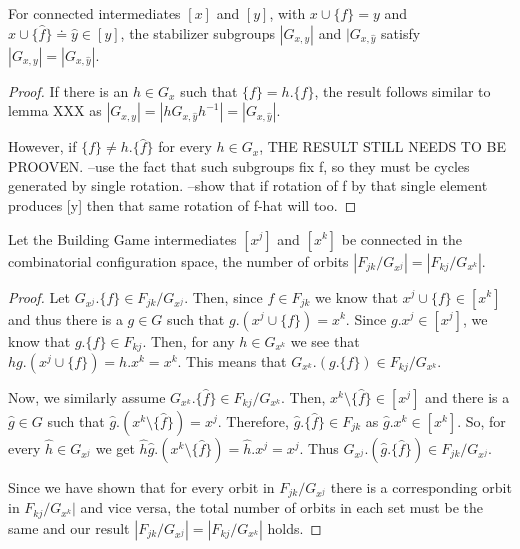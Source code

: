 \begin{mylem}
For connected intermediates $[x]$ and $[y]$, with $x \cup \{f\} = y$ and $x \cup \{\hat{f}\} \doteq \hat{y}\in [y]$, the stabilizer subgroups $|G_{x,y}|$ and  $|G_{x,\hat{y}}$ satisfy $|G_{x,y}| = |G_{x,\hat{y}}|$. 
\end{mylem}
\begin{proof}
If there is an $h \in G_x$ such that $\{f\} = h.\{\hat{f}\}$, the result follows similar to lemma XXX as $|G_{x,y}| = |hG_{x,\hat{y}}h^{-1}| = |G_{x,\hat{y}}|$.

However, if $\{f\} \neq h.\{\hat{f}\}$ for every $h \in G_x$, THE RESULT STILL NEEDS TO BE PROOVEN. 
--use the fact that such subgroups fix f, so they must be cycles generated by single rotation. --show that if rotation of f by that single element produces [y] then that same rotation of f-hat will too.  
\end{proof}



\begin{mylem}
\label{lem:I}
Let the Building Game intermediates $[x^j]$ and $[x^k]$ be connected in the combinatorial configuration space, the number of orbits $|F_{jk}/G_{x^j}| = |F_{kj}/G_{x^k}|$.
\end{mylem}
\begin{proof}
Let $G_{x^j}.\{f\} \in F_{jk}/G_{x^j}$. Then, since $f \in F_{jk}$ we know that $x^j\cup\{f\} \in [x^k]$ and thus there is a $g \in G$ such that $g.(x^j\cup\{f\}) = x^k$. Since $g.x^j \in [x^j]$, we know that $g.\{f\} \in F_{kj}$. Then, for any $h \in G_{x^k}$ we see that $hg.(x^j\cup\{f\}) = h.x^k = x^k$. This means that $G_{x^k}.(g.\{f\}) \in F_{kj}/G_{x^k}$.

Now, we similarly assume $G_{x^k}.\{\hat{f}\} \in F_{kj}/G_{x^k}$. Then, $x^k \setminus \{\hat{f}\} \in [x^j]$ and there is a $\hat{g} \in G$ such that $\hat{g}.(x^k \setminus \{\hat{f}\}) = x^j$. Therefore, $\hat{g}.\{\hat{f}\} \in F_{jk}$ as $\hat{g}.x^k \in [x^k]$. So, for every $\hat{h} \in G_{x^j}$ we get $\hat{h}\hat{g}.(x^k\setminus\{\hat{f}\}) = \hat{h}.x^j = x^j$. Thus $G_{x^j}.(\hat{g}.\{\hat{f}\}) \in F_{jk}/G_{x^j}$.

Since we have shown that for every orbit in $F_{jk}/G_{x^j}$ there is a corresponding orbit in $F_{kj}/G_{x^k}|$ and vice versa, the total number of orbits in each set must be the same and our result $|F_{jk}/G_{x^j}| = |F_{kj}/G_{x^k}|$ holds.
\end{proof}



